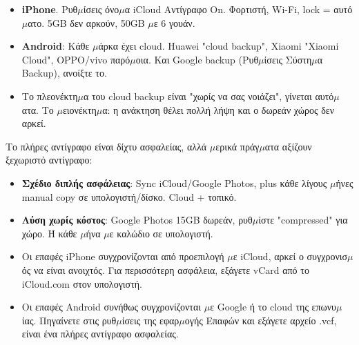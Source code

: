 
\begin{itemize}
  \item \textbf{iPhone}. Ρυθ$\mu$ίσεις όνο$\mu$α iCloud Αντίγραφο On. Φορτιστή, Wi-Fi, lock = αυτό$\mu$ατο. 5GB δεν αρκούν, 50GB $\mu$ε 6 γουάν.
  \item \textbf{Android}: Κάθε $\mu$άρκα έχει cloud. Huawei "cloud backup", Xiaomi "Xiaomi Cloud", OPPO/vivo παρό$\mu$οια. Και Google backup (Ρυθ$\mu$ίσεις Σύστη$\mu$α Backup), ανοίξτε το.
  \item Το πλεονέκτη$\mu$α του cloud backup είναι "χωρίς να σας νοιάζει", γίνεται αυτό$\mu$ατα. Το $\mu$ειονέκτη$\mu$α: η ανάκτηση θέλει πολλή λήψη και ο δωρεάν χώρος δεν αρκεί.
\end{itemize}


Το πλήρες αντίγραφο είναι δίχτυ ασφαλείας, αλλά $\mu$ερικά πράγ$\mu$ατα αξίζουν ξεχωριστό αντίγραφο:


\begin{itemize}
  \item \textbf{Σχέδιο διπλής ασφάλειας}: Sync iCloud/Google Photos, plus κάθε λίγους $\mu$ήνες manual copy σε υπολογιστή/δίσκο. Cloud + τοπικό.
  \item \textbf{Λύση χωρίς κόστος}: Google Photos 15GB δωρεάν, ρυθ$\mu$ίστε "compressed" για χώρο. Ή κάθε $\mu$ήνα $\mu$ε καλώδιο σε υπολογιστή.
\end{itemize}


\begin{itemize}
  \item Οι επαφές iPhone συγχρονίζονται από προεπιλογή $\mu$ε iCloud, αρκεί ο συγχρονισ$\mu$ός να είναι ανοιχτός. Για περισσότερη ασφάλεια, εξάγετε vCard από το iCloud.com στον υπολογιστή.
  \item Οι επαφές Android συνήθως συγχρονίζονται $\mu$ε Google ή το cloud της επωνυ$\mu$ίας. Πηγαίνετε στις ρυθ$\mu$ίσεις της εφαρ$\mu$ογής Επαφών και εξάγετε αρχείο .vcf, είναι ένα πλήρες αντίγραφο ασφαλείας.
\end{itemize}


